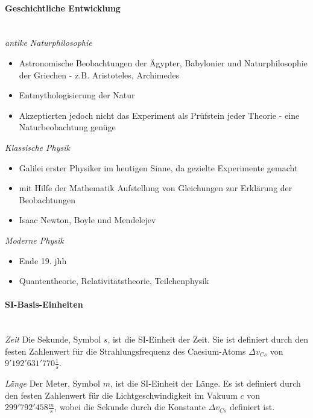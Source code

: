 \noindent
\paragraph{Geschichtliche Entwicklung}\mbox{}\\
\textit{antike Naturphilosophie}\linebreak
\begin{itemize}
	\item Astronomische Beobachtungen der Ägypter, Babylonier und Naturphilosophie der Griechen - z.B. Aristoteles, Archimedes
	\item Entmythologisierung der Natur
	\item Akzeptierten jedoch nicht das Experiment als Prüfstein jeder Theorie - eine Naturbeobachtung genüge
\end{itemize}
\vspace{1mm}

\textit{Klassische Physik}\linebreak
\begin{itemize}
	\item Galilei erster Physiker im heutigen Sinne, da gezielte Experimente gemacht
	\item mit Hilfe der Mathematik Aufstellung von Gleichungen zur Erklärung der Beobachtungen
	\item Isaac Newton, Boyle und Mendelejev
\end{itemize}
\vspace{1mm}

\textit{Moderne Physik}\linebreak
\begin{itemize}
	\item Ende 19. jhh
	\item Quantentheorie, Relativitätstheorie, Teilchenphysik
\end{itemize}
\vspace{1mm}

\paragraph{SI-Basis-Einheiten}\mbox{}\\
\textit{Zeit}\linebreak
Die Sekunde, Symbol $s$, ist die SI-Einheit der Zeit.
Sie ist definiert durch den festen Zahlenwert für die Strahlungsfrequenz
des Caesium-Atoms $\Delta{v_{Cs}}$ von $9'192'631'770\frac{1}{s}$.
\vspace{1mm}

\textit{Länge}\linebreak
Der Meter, Symbol $m$, ist die SI-Einheit der Länge. Es ist definiert durch
den festen Zahlenwert für die Lichtgeschwindigkeit im Vakuum $c$ von
$299'792'458\frac{m}{s}$, wobei die Sekunde durch die Konstante $\Delta{v_{Cs}}$
definiert ist.
\vspace{1mm}

